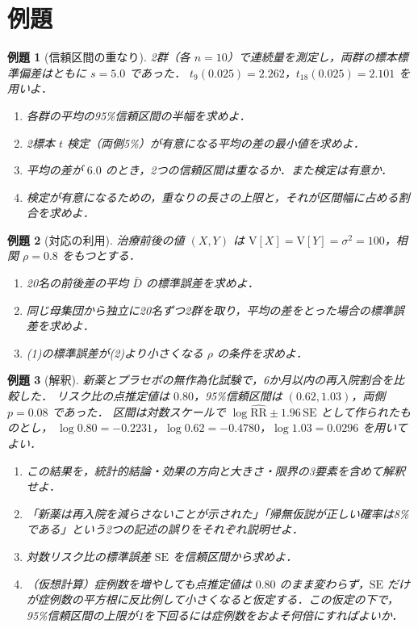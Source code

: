 \documentclass[a4paper,11pt,openany]{ltjsbook}
\newtheorem{reidai}{例題}[chapter]
\newcommand{\V}{\mathrm{V}}
\newcommand{\SE}{\mathrm{SE}}
\newcommand{\RR}{\mathrm{RR}}
\begin{document}
\section{例題}\label{sec:01-ex}
\begin{reidai}[信頼区間の重なり]\label{reidai:01-1}
2群（各 $n=10$）で連続量を測定し，両群の標本標準偏差はともに $s=5.0$ であった．
$t_9(0.025)=2.262$，$t_{18}(0.025)=2.101$ を用いよ．
\begin{enumerate}[label=(\arabic*)]
\item 各群の平均の95\%信頼区間の半幅を求めよ．
\item 2標本 $t$ 検定（両側5\%）が有意になる平均の差の最小値を求めよ．
\item 平均の差が $6.0$ のとき，2つの信頼区間は重なるか．また検定は有意か．
\item 検定が有意になるための，重なりの長さの上限と，それが区間幅に占める割合を求めよ．
\end{enumerate}
\end{reidai}

\begin{reidai}[対応の利用]\label{reidai:01-2}
治療前後の値 $(X,Y)$ は
$\V[X]=\V[Y]=\sigma^2=100$，相関 $\rho=0.8$ をもつとする．
\begin{enumerate}[label=(\arabic*)]
\item 20名の前後差の平均 $\bar D$ の標準誤差を求めよ．
\item 同じ母集団から独立に20名ずつ2群を取り，平均の差をとった場合の標準誤差を求めよ．
\item (1)の標準誤差が(2)より小さくなる $\rho$ の条件を求めよ．
\end{enumerate}
\end{reidai}

\begin{reidai}[解釈]\label{reidai:01-3}
新薬とプラセボの無作為化試験で，6か月以内の再入院割合を比較した．
リスク比の点推定値は $0.80$，95\%信頼区間は $(0.62,1.03)$，両側 $p=0.08$ であった．
区間は対数スケールで $\log\widehat{\RR}\pm1.96\,\SE$ として作られたものとし，
$\log0.80=-0.2231$，$\log0.62=-0.4780$，$\log1.03=0.0296$ を用いてよい．
\begin{enumerate}[label=(\arabic*)]
\item この結果を，統計的結論・効果の方向と大きさ・限界の3要素を含めて解釈せよ．
\item 「新薬は再入院を減らさないことが示された」「帰無仮説が正しい確率は8\%である」という2つの記述の誤りをそれぞれ説明せよ．
\item 対数リスク比の標準誤差 $\SE$ を信頼区間から求めよ．
\item （仮想計算）症例数を増やしても点推定値は $0.80$ のまま変わらず，$\SE$ だけが症例数の平方根に反比例して小さくなると仮定する．この仮定の下で，95\%信頼区間の上限が1を下回るには症例数をおよそ何倍にすればよいか．
\end{enumerate}
\end{reidai}
\end{document}
